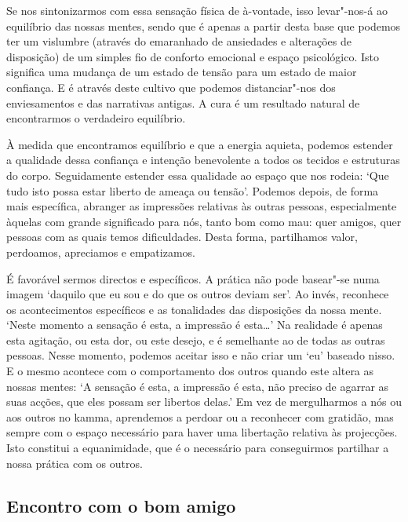 Se nos sintonizarmos com essa sensação física de à-vontade, isso levar"-nos-á ao
equilíbrio das nossas mentes, sendo que é apenas a partir desta base que podemos
ter um vislumbre (através do emaranhado de ansiedades e alterações de
disposição) de um simples fio de conforto emocional e espaço psicológico. Isto
significa uma mudança de um estado de tensão para um estado de maior confiança.
E é através deste cultivo que podemos distanciar"-nos dos enviesamentos e das
narrativas antigas. A cura é um resultado natural de encontrarmos o verdadeiro
equilíbrio.

À medida que encontramos equilíbrio e que a energia aquieta, podemos estender a
qualidade dessa confiança e intenção benevolente a todos os tecidos e estruturas
do corpo. Seguidamente estender essa qualidade ao espaço que nos rodeia: `Que
tudo isto possa estar liberto de ameaça ou tensão'. Podemos depois, de forma
mais específica, abranger as impressões relativas às outras pessoas,
especialmente àquelas com grande significado para nós, tanto bom como mau: quer
amigos, quer pessoas com as quais temos dificuldades. Desta forma, partilhamos
valor, perdoamos, apreciamos e empatizamos.

É favorável sermos directos e específicos. A prática não pode basear"-se numa
imagem `daquilo que eu sou e do que os outros deviam ser'. Ao invés, reconhece
os acontecimentos específicos e as tonalidades das disposições da nossa mente.
`Neste momento a sensação é esta, a impressão é esta\ldots{}' Na realidade é
apenas esta agitação, ou esta dor, ou este desejo, e é semelhante ao de todas as
outras pessoas. Nesse momento, podemos aceitar isso e não criar um `eu' baseado
nisso. E o mesmo acontece com o comportamento dos outros quando este altera as
nossas mentes: `A sensação é esta, a impressão é esta, não preciso de agarrar as
suas acções, que eles possam ser libertos delas.' Em vez de mergulharmos a nós
ou aos outros no kamma, aprendemos a perdoar ou a reconhecer com gratidão, mas
sempre com o espaço necessário para haver uma libertação relativa às projecções.
Isto constitui a equanimidade, que é o necessário para conseguirmos partilhar a
nossa prática com os outros.

\subsection{Encontro com o bom amigo}

